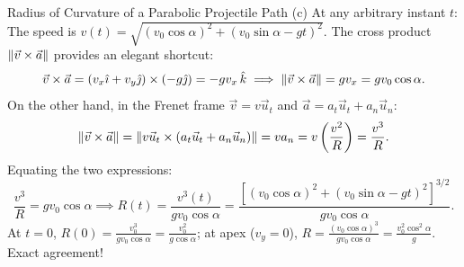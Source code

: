 \begin{workedexample}{Radius of Curvature of a Parabolic Projectile Path}
(c) At any arbitrary instant $t$:
The speed is $v(t) = \sqrt{(v_0\cos\alpha)^2 + (v_0\sin\alpha - gt)^2}$.
The cross product $\left\lVert \vec{v}\times\vec{a} \right\rVert$ provides an elegant shortcut:
\[
\vec{v}\times\vec{a} = (v_x\hat{\imath} + v_y\hat{\jmath})\times(-g\hat{\jmath}) = -g v_x\,\hat{k} \implies \left\lVert \vec{v}\times\vec{a} \right\rVert = g v_x = g v_0\cos\alpha.
\]
On the other hand, in the Frenet frame $\vec{v} = v\vec{u}_t$ and $\vec{a} = a_t\vec{u}_t + a_n\vec{u}_n$:
\[
\left\lVert \vec{v}\times\vec{a} \right\rVert = \left\lVert v\vec{u}_t\times(a_t\vec{u}_t + a_n\vec{u}_n) \right\rVert = v a_n = v\left(\frac{v^2}{R}\right) = \frac{v^3}{R}.
\]
Equating the two expressions:
\[
\frac{v^3}{R} = g v_0\cos\alpha \implies \boxed{R(t) = \frac{v^3(t)}{g v_0\cos\alpha} = \frac{\left[ (v_0\cos\alpha)^2 + (v_0\sin\alpha - gt)^2 \right]^{3/2}}{g v_0\cos\alpha}.}
\]
At $t = 0$, $R(0) = \frac{v_0^3}{g v_0\cos\alpha} = \frac{v_0^2}{g\cos\alpha}$; at apex ($v_y = 0$), $R = \frac{(v_0\cos\alpha)^3}{g v_0\cos\alpha} = \frac{v_0^2\cos^2\alpha}{g}$. Exact agreement!
\end{workedexample}

